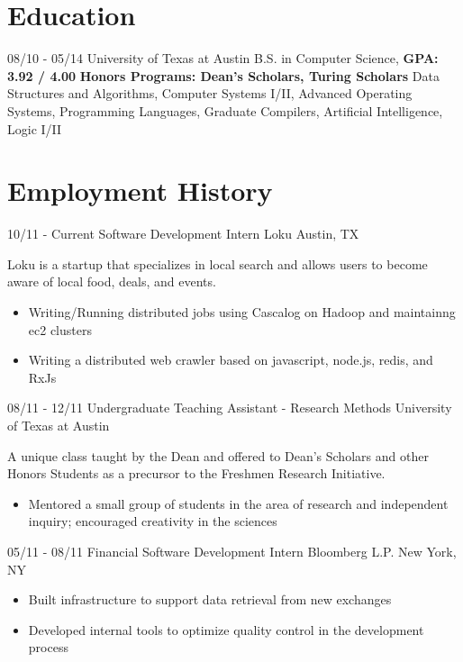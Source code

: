 \documentclass[11pt,letter,sans]{moderncv}
\begin{document}
\maketitle

\section{Education}
\cventry
{08/10 - 05/14}
{University of Texas at Austin}
{B.S. in Computer Science, \textbf{GPA: 3.92 / 4.00}}
{}
{}
{\textbf{Honors Programs: Dean's Scholars, Turing Scholars}}
{ Data Structures and Algorithms, Computer
  Systems I/II, Advanced Operating Systems, Programming Languages, Graduate
Compilers, Artificial Intelligence, Logic I/II}


\section{Employment History}
\cventry
{10/11 - Current}
{Software Development Intern}
{Loku}
{Austin, TX}
{}
{Loku is a startup that specializes in local search and allows users to become
  aware of local food, deals, and events.
  \begin{itemize}
    \item Writing/Running distributed jobs using Cascalog on Hadoop and
      maintainng ec2 clusters
    \item Writing a distributed web crawler based on javascript, node.js, redis, and RxJs
\end{itemize}}

\cventry
{08/11 - 12/11}
{Undergraduate Teaching Assistant - Research Methods}
{University of Texas at Austin}
{}
{}
{A unique class taught by the Dean and offered to Dean's Scholars and other
  Honors Students as a precursor to the Freshmen Research Initiative.
  \begin{itemize}
    \item Mentored a small group of students in the area of research and
      independent inquiry; encouraged creativity in the sciences
\end{itemize}}

\cventry
{05/11 - 08/11}
{Financial Software Development Intern}
{Bloomberg L.P.}
{New York, NY}
{}
{
  \begin{itemize}
    \item Built infrastructure to support data retrieval from new exchanges
    \item Developed internal tools to optimize quality control in the
      development process
\end{itemize}}
\end{document}
